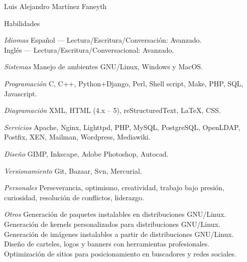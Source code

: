 \documentclass[11pt,letterpaper]{article}
\begin{document}
\begin{cv}{Luis Alejandro Mart\'inez Faneyth}
\begin{cvlist}{Habilidades}
\item[\textit{\large{Idiomas}}]{
	Espa\~nol --- Lectura/Escritura/Conversación: Avanzado.\\
	Ingl\'es --- Lectura/Escritura/Conversacional: Avanzado.
}
\item[\textit{\large{Sistemas}}]{Manejo de ambientes GNU/Linux, Windows y MacOS.}
\item[\textit{\large{Programaci\'on}}]{C, C++, Python+Django, Perl, Shell script, Make, PHP, SQL, Javascript.}
\item[\textit{\large{Diagramaci\'on}}]{XML, HTML (4.x -- 5), reStructuredText, \LaTeX, CSS.}
\item[\textit{\large{Servicios}}]{Apache, Nginx, Lighttpd, PHP, MySQL, PostgreSQL, OpenLDAP, Postfix, XEN, Mailman, Wordpress, Mediawiki.}
\item[\textit{\large{Dise\~no}}]{GIMP, Inkscape, Adobe Photoshop, Autocad.}
\item[\textit{\large{Versionamiento}}]{Git, Bazaar, Svn, Mercurial.}
\item[\textit{\large{Personales}}]{Perseverancia, optimismo, creatividad, trabajo bajo presi\'on, curiosidad, resoluci\'on de conflictos, liderazgo.}
\item[\textit{\large{Otros}}]{
	Generaci\'on de paquetes instalables en distribuciones GNU/Linux.\\
	Generaci\'on de kernels personalizados para distribuciones GNU/Linux.\\
	Generaci\'on de im\'agenes instalables a partir de distribuciones GNU/Linux.\\
	Dise\~no de carteles, logos y banners con herramientas profesionales.\\
	Optimización de sitios para posicionamiento en buscadores y redes sociales.
}
\end{cvlist}

\end{cv}
\end{document}
